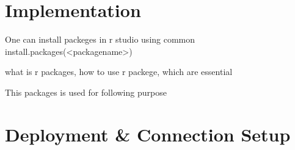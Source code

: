 \section{Implementation}\label{}

One can install packeges in r studio using common  install.packages(<packagename>)

what is r packages, how to use r packege, which are essential

This packages is used for following purpose
\section{Deployment \& Connection Setup}
